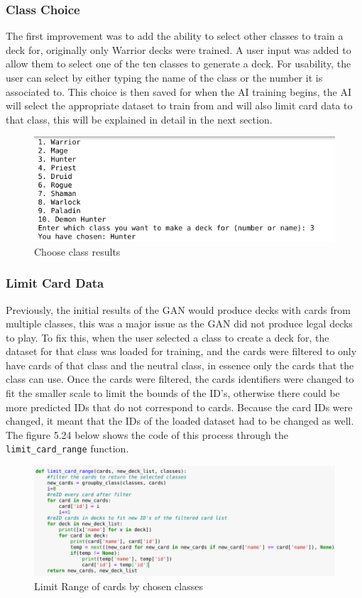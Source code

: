 \documentclass{report} %
\begin{document}
\subsubsection{Class Choice}
The first improvement was to add the ability to select other classes to train a deck for, originally only Warrior decks were trained. A user input was added to allow them to select one of the ten classes to generate a deck. For usability, the user can select by either typing the name of the class or the number it is associated to. This choice is then saved for when the AI training begins, the AI will select the appropriate dataset to train from and will also limit card data to that class, this will be explained in detail in the next section.

\begin{figure}[H]
\centering
\includegraphics[width=1\textwidth]{choice}
\caption{Choose class results \protect}
\label{board}
\end{figure}

\subsubsection{Limit Card Data}
Previously, the initial results of the GAN would produce decks with cards from multiple classes, this was a major issue as the GAN did not produce legal decks to play. To fix this, when the user selected a class to create a deck for, the dataset for that class was loaded for training, and the cards were filtered to only have cards of that class and the neutral class, in essence only the cards that the class can use. Once the cards were filtered, the cards identifiers were changed to fit the smaller scale to limit the bounds of the ID's, otherwise there could be more predicted IDs that do not correspond to cards. Because the card IDs were changed, it meant that the IDs of the loaded dataset had to be changed as well. The figure 5.24 below shows the code of this process through the \nolinkurl{limit_card_range} function.

\begin{figure}[H]
\centering
\includegraphics[width=1.25\textwidth]{limitCardRange}
\caption{Limit Range of cards by chosen classes \protect}
\label{board}
\end{figure}
\end{document}
